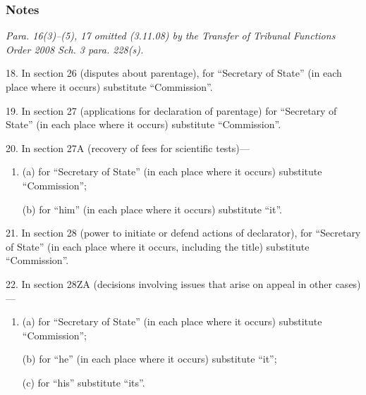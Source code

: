 \documentclass[a4paper]{article}
\newcommand\amendment[1]{\subsubsection*{Notes}{\itshape\frenchspacing\footnotesize #1 \par}}
\begin{document}
%
%
%

\amendment{
Para. 16(3)--(5), 17 omitted (3.11.08) by the Transfer of Tribunal Functions Order 2008 Sch. 3 para. 228(s).
}
%

\medskip

18. In section 26 (disputes about parentage), for “Secretary of State” (in each place where it occurs) substitute “Commission”.

\medskip

19. In section 27 (applications for declaration of parentage) for “Secretary of State” (in each place where it occurs) substitute “Commission”.

\medskip

20. In section 27A (recovery of fees for scientific tests)—
\begin{enumerate}\item[]
(a) for “Secretary of State” (in each place where it occurs) substitute “Commission”;

(b) for “him” (in each place where it occurs) substitute “it”.
\end{enumerate}

\medskip

21. In section 28 (power to initiate or defend actions of declarator), for “Secretary of State” (in each place where it occurs, including the title) substitute “Commission”.

\medskip

22. In section 28ZA (decisions involving issues that arise on appeal in other cases)—
\begin{enumerate}\item[]
(a) for “Secretary of State” (in each place where it occurs) substitute “Commission”;

(b) for “he” (in each place where it occurs) substitute “it”;

(c) for “his” substitute “its”.
\end{enumerate}
\end{document}
